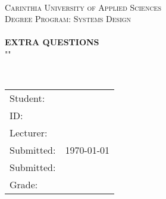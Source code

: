 \begin{titlepage}

\begin{center}


	\\[1cm]
	
\textsc{\LARGE Carinthia University of Applied Sciences}\\[1.5cm]

\textsc{\Large Degree Program: Systems Design}\\[5cm]


\HRule \\[1cm]
{ \huge \bfseries EXTRA QUESTIONS }\\[.5cm]
"\course"\\[.3cm]
\labtitle

\HRule \\[3cm]



\vfill

	\begin{table}[H]
		\centering
		\begin{tabular}{|l|c|}
			\toprule
			Student: & \stusurname\ \textsc{\stuname} \\
			ID: & \stuid   	\\
			\midrule
			Lecturer: & \lecturer  \\
			Submitted: & {\large \today}  	\\
			Submitted: &  \\
			Grade: &  \\
			\bottomrule
		\end{tabular}
	\end{table}


\end{center}

\end{titlepage}